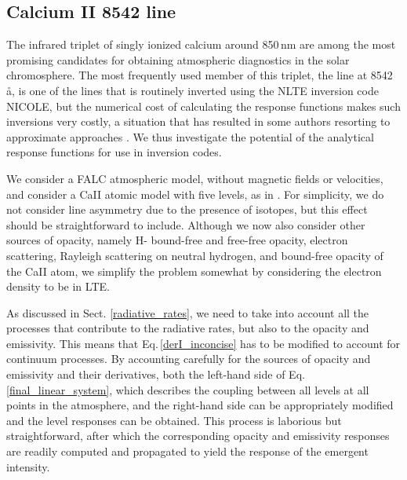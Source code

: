\documentclass[referee]{aa}
\begin{document}
\subsection{ Calcium II 8542 line}
\label{CaII}

The infrared triplet of singly ionized calcium around 850\,nm are among the most promising candidates for obtaining atmospheric diagnostics \citep[see][for an in-depth discussion of response function and diagnostic capabilities]{Ca_diag_Jaime} in the solar chromosphere. The most frequently used member of this triplet, the line at 8542\,\aa, is one of the lines that is routinely inverted using the NLTE inversion code NICOLE, but the numerical cost of calculating the response functions makes such inversions very costly, a situation that has resulted in some authors resorting to approximate approaches \citep{Beck_inversion_2015}. We thus investigate the potential of the analytical response functions for use in inversion codes.

We consider a FALC atmospheric model, without magnetic fields or velocities, and consider a CaII atomic model with five levels, as in \citet{Ca_diag_Jaime}. For simplicity, we do not consider line asymmetry due to the presence of isotopes, but this effect should be straightforward to include. Although we now also consider other sources of opacity, namely H- bound-free and free-free opacity, electron scattering, Rayleigh scattering on neutral hydrogen, and bound-free opacity of the CaII atom, we simplify the problem somewhat by considering the electron density to be in LTE. 

As discussed in Sect. \ref{radiative_rates}, we need to take into account all the processes that contribute to the radiative rates, but also to the opacity and emissivity. This means that Eq.\,\ref{derI_inconcise} has to be modified to account for continuum processes. By accounting carefully for the sources of opacity and emissivity and their derivatives, both the left-hand side of Eq.\,\ref{final_linear_system}, which describes the coupling between all levels at all points in the atmosphere, and the right-hand side can be appropriately modified and the level responses can be obtained. This process is laborious but straightforward, after which the corresponding opacity and emissivity responses are readily computed and propagated to yield the response of the emergent intensity.
\end{document}
